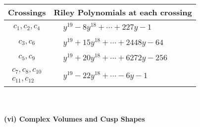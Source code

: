 \documentclass[1p]{elsarticle_modified}
\theoremstyle{definition}
\begin{document}
\begin{tabular}{m{50pt}|m{274pt}}
Crossings & \hspace{64pt}Riley Polynomials at each crossing \\
\hline $$\begin{aligned}c_{1},c_{2},c_{4}\end{aligned}$$&$\begin{aligned}
&y^{19}-8 y^{18}+\cdots+227 y-1
\end{aligned}$\\
\hline $$\begin{aligned}c_{3},c_{6}\end{aligned}$$&$\begin{aligned}
&y^{19}+15 y^{18}+\cdots+2448 y-64
\end{aligned}$\\
\hline $$\begin{aligned}c_{5},c_{9}\end{aligned}$$&$\begin{aligned}
&y^{19}+20 y^{18}+\cdots+6272 y-256
\end{aligned}$\\
\hline $$\begin{aligned}c_{7},c_{8},c_{10}\\c_{11},c_{12}\end{aligned}$$&$\begin{aligned}
&y^{19}-22 y^{18}+\cdots-6 y-1
\end{aligned}$\\
\hline
\end{tabular}\\~\\
\newpage\flushleft \textbf{(vi) Complex Volumes and Cusp Shapes}
\end{document}
